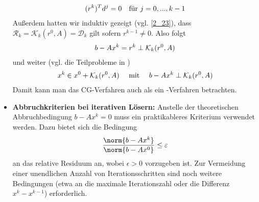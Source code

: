 \begin{itemize}
	\begin{align}
		(r^k)^Td^j=0\quad\text{für } j=0,...,k-1\notag
	\end{align}
	Außerdem hatten wir induktiv gezeigt (vgl. \cref{2_23}), dass $\mathcal{R}_k=\mathcal{K}_k(r^0,A)=\mathcal{D}_k$ gilt sofern $r^{k-1}\neq 0$. Also folgt
	\begin{align}
		b-Ax^k = r^k\perp \mathcal{K}_k(r^0,A)\notag
	\end{align}
	und weiter (vgl. die Teilprobleme in )
	\begin{align}
		x^k\in x^0+\mathcal{K}_k(r^0,A)\quad\mit\quad b-Ax^k\perp \mathcal{K}_k(r^0,A)\notag
	\end{align}
	Damit kann man das CG-Verfahren auch als ein -Verfahren betrachten.
	\item \textbf{Abbruchkriterien bei iterativen Lösern:} Anstelle der theoretischen Abbruchbedingung $b-Ax^k=0$ muss ein praktikableres Kriterium verwendet werden. Dazu bietet sich die Bedingung
	\begin{align}
		\frac{\norm{b-Ax^k}}{\norm{b-Ax^0}} \le \epsilon\notag
	\end{align}
	an das relative Residuum an, wobei $\epsilon>0$ vorzugeben ist. Zur Vermeidung einer unendlichen Anzahl von Iterationsschritten sind noch weitere Bedingungen (etwa an die maximale Iterationszahl oder die Differenz $x^k-x^{k-1}$) erforderlich.
\end{itemize}
